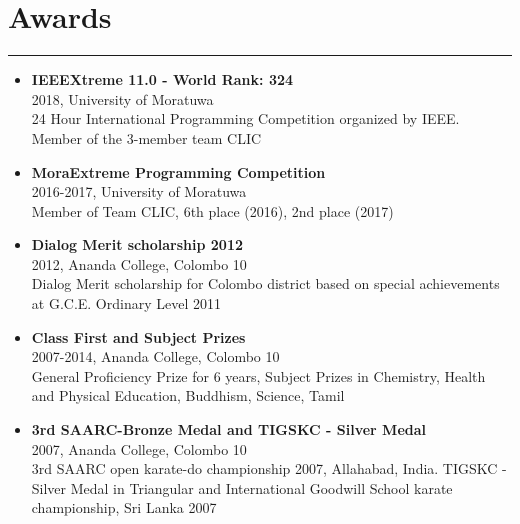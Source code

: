 \documentclass[a4paper,10pt]{article}
\newcommand{\ressection}[1]{\section*{#1}\vspace{-0.5em}\hrule\vspace{0.5em}}
\newenvironment{myitemize}
  {\begin{itemize}[left=0pt,label=,itemsep=5pt]}
  {\end{itemize}}
\begin{document}
\ressection{Awards}
\begin{myitemize}
    \item \textbf{IEEEXtreme 11.0 - World Rank: 324} \\
          2018, University of Moratuwa \\
          24 Hour International Programming Competition organized by IEEE. Member of the 3-member team CLIC
    \item \textbf{MoraExtreme Programming Competition} \\
          2016-2017, University of Moratuwa \\
          Member of Team CLIC, 6th place (2016), 2nd place (2017)
    \item \textbf{Dialog Merit scholarship 2012} \\
          2012, Ananda College, Colombo 10 \\
          Dialog Merit scholarship for Colombo district based on special achievements at G.C.E. Ordinary Level 2011
    \item \textbf{Class First and Subject Prizes} \\
          2007-2014, Ananda College, Colombo 10 \\
          General Proficiency Prize for 6 years, Subject Prizes in Chemistry, Health and Physical Education, Buddhism, Science, Tamil
    \item \textbf{3rd SAARC-Bronze Medal and TIGSKC - Silver Medal} \\
          2007, Ananda College, Colombo 10 \\
          3rd SAARC open karate-do championship 2007, Allahabad, India. TIGSKC - Silver Medal in Triangular and International Goodwill School karate championship, Sri Lanka 2007
\end{myitemize}
\end{document}
